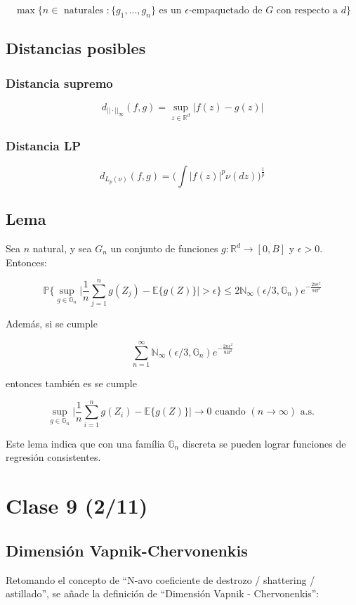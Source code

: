 \documentclass[12pt, a4paper]{article}
\begin{document}
$$ \mathop{max}\big \{ n\in \text{ naturales }: \{ g_1, ..., g_n \} \text{ es un $\epsilon$-empaquetado de $G$ con respecto a $d$} \big \} $$

\subsection{Distancias posibles}
\subsubsection{Distancia supremo}
$$ d_{||\cdot||_{\infty}}(f,g)=\mathop{sup}_{z\in \mathds{R}^d}|f(z)-g(z)| $$
\subsubsection{Distancia LP}

$$ d_{L_p(\nu)}(f,g)=\bigg ( \int |f(z)|^p \nu(dz) \bigg )^{\frac{1}{p}}$$

\subsection{Lema}

Sea $n$ natural, y sea $G_n$ un conjunto de funciones $g:\mathds{R}^d \rightarrow [0,B]$ y $\epsilon > 0$. Entonces:

$$
\mathds{P}\Bigg \{ \mathop{sup}_{g\in \mathds{G}_n} \Big | \frac{1}{n} \sum_{j=1}^n g(Z_j)-\mathds{E}\{ g(Z) \} \Big | > \epsilon \Bigg \} \leq 2 \mathds{N}_{\infty} (\epsilon/3,\mathds{G}_n) e^{-\frac{2n\epsilon^2}{9B^2}}
$$

Además, si se cumple

$$
\sum_{n=1}^{\infty} \mathds{N}_{\infty} (\epsilon/3,\mathds{G}_n)e^{-\frac{2n\epsilon^2}{9B^2}}
$$

entonces también es se cumple

$$ \mathop{sup}_{g\in\mathds{G}_n} \Bigg | \frac{1}{n} \sum_{i=1}^n g(Z_i) - \mathds{E}\{g(Z)\} \Bigg | \rightarrow 0 \text{ cuando } (n\rightarrow \infty) \text{ a.s. }$$

Este lema indica que con una família $\mathds{G}_n$ discreta se pueden lograr funciones de regresión consistentes.

\section{Clase 9 (2/11)}
\subsection{Dimensión Vapnik-Chervonenkis}
Retomando el concepto de ``N-avo coeficiente de destrozo / shattering / astillado'', se añade la definición de ``Dimensión Vapnik - Chervonenkis'':
\end{document}
